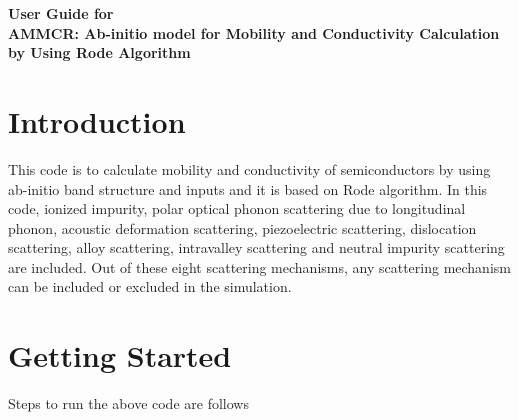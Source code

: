 \documentclass[12pt]{article}
\date{}
\begin{document}
\begin{titlepage}
\begin{center}
\Huge
\textbf{User Guide for \\
AMMCR: Ab-initio model for Mobility and Conductivity Calculation by Using Rode Algorithm\\ }
\end{center}
\end{titlepage}
  
\tableofcontents

\newpage
  
\section{Introduction}

This code is to calculate mobility and conductivity of semiconductors by using ab-initio band structure and inputs and it is based on Rode \cite{rode1,rode2,rode3, rode4} algorithm. In this code, ionized impurity, polar optical phonon scattering due to longitudinal phonon, acoustic deformation scattering, piezoelectric scattering, dislocation scattering, alloy scattering, intravalley scattering and neutral impurity scattering are included. Out of these eight scattering mechanisms, any scattering mechanism can be included or excluded in the simulation.

\section{Getting Started}

Steps to run the above code are follows
\end{document}
